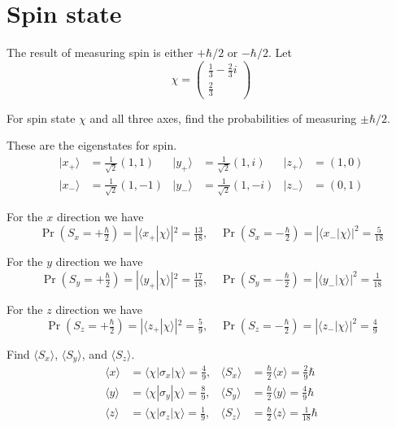 

\section*{Spin state}

The result of measuring spin is either $+\hbar/2$ or $-\hbar/2$.
Let
\begin{equation*}
\chi=\begin{pmatrix}\frac{1}{3}-\frac{2}{3}i\\[1ex]\frac{2}{3}\end{pmatrix}
\end{equation*}

For spin state $\chi$ and all three axes, find the probabilities of measuring $\pm\hbar/2$.

\bigskip
These are the eigenstates for spin.
\begin{align*}
|x_+\rangle&=\tfrac{1}{\sqrt2}(1,1) &
|y_+\rangle&=\tfrac{1}{\sqrt2}(1,i) &
|z_+\rangle&=(1,0)
\\
|x_-\rangle&=\tfrac{1}{\sqrt2}(1,-1) &
|y_-\rangle&=\tfrac{1}{\sqrt2}(1,-i) &
|z_-\rangle&=(0,1)
\end{align*}

For the $x$ direction we have
\begin{equation*}
\Pr\left(S_x=+\tfrac{\hbar}{2}\right)=|\langle x_+|\chi\rangle|^2=\tfrac{13}{18},\quad
\Pr\left(S_x=-\tfrac{\hbar}{2}\right)=|\langle x_-|\chi\rangle|^2=\tfrac{5}{18}
\end{equation*}

For the $y$ direction we have
\begin{equation*}
\Pr\left(S_y=+\tfrac{\hbar}{2}\right)=|\langle y_+|\chi\rangle|^2=\tfrac{17}{18},\quad
\Pr\left(S_y=-\tfrac{\hbar}{2}\right)=|\langle y_-|\chi\rangle|^2=\tfrac{1}{18}
\end{equation*}

For the $z$ direction we have
\begin{equation*}
\Pr\left(S_z=+\tfrac{\hbar}{2}\right)=|\langle z_+|\chi\rangle|^2=\tfrac{5}{9},\quad
\Pr\left(S_z=-\tfrac{\hbar}{2}\right)=|\langle z_-|\chi\rangle|^2=\tfrac{4}{9}
\end{equation*}

Find $\langle S_x\rangle$, $\langle S_y\rangle$, and $\langle S_z\rangle$.
\begin{align*}
\langle x\rangle&=\langle\chi|\sigma_x|\chi\rangle=\tfrac{4}{9}, &
\langle S_x\rangle&=\tfrac{\hbar}{2}\langle x\rangle=\tfrac{2}{9}\hbar
\\[1ex]
\langle y\rangle&=\langle\chi|\sigma_y|\chi\rangle=\tfrac{8}{9}, &
\langle S_y\rangle&=\tfrac{\hbar}{2}\langle y\rangle=\tfrac{4}{9}\hbar
\\[1ex]
\langle z\rangle&=\langle\chi|\sigma_z|\chi\rangle=\tfrac{1}{9}, &
\langle S_z\rangle&=\tfrac{\hbar}{2}\langle z\rangle=\tfrac{1}{18}\hbar
\end{align*}



